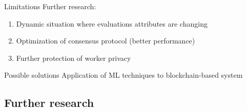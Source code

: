 \begin{frame}{Limitations}
	Further research:
  \begin{enumerate}
  \item Dynamic situation where evaluations attributes are changing
  \item Optimization of consensus protocol (better performance)
  \item Further protection of worker privacy
  \end{enumerate}
  \begin{block}{Possible solutions}
  Application of ML techniques to blockchain-based system
  \end{block}
\end{frame}

\subsection{Further research}